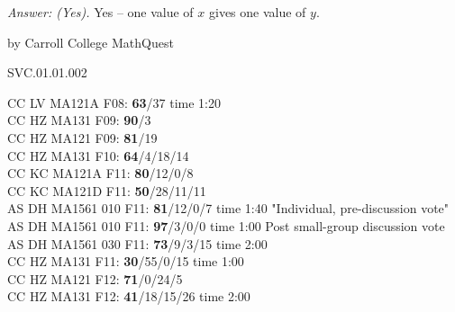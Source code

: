 {\it Answer: (Yes).} Yes -- one value of $x$ gives one value of $y$.

\medskip



by Carroll College MathQuest

SVC.01.01.002


CC LV MA121A F08: {\bf 63}/37 time 1:20 \\
CC HZ MA131 F09: {\bf 90}/3  \\
CC HZ MA121 F09: {\bf 81}/19  \\
CC HZ MA131 F10: {\bf 64}/4/18/14  \\
CC KC MA121A F11: {\bf 80}/12/0/8  \\
CC KC MA121D F11: {\bf 50}/28/11/11  \\
AS DH MA1561 010 F11: {\bf 81}/12/0/7 time 1:40 "Individual, pre-discussion vote" \\
AS DH MA1561 010 F11: {\bf 97}/3/0/0 time 1:00 Post small-group discussion vote \\
AS DH MA1561 030 F11: {\bf 73}/9/3/15 time 2:00  \\
CC HZ MA131 F11: {\bf 30}/55/0/15 time 1:00  \\
CC HZ MA121 F12: {\bf 71}/0/24/5  \\
CC HZ MA131 F12: {\bf 41}/18/15/26 time 2:00  \\

